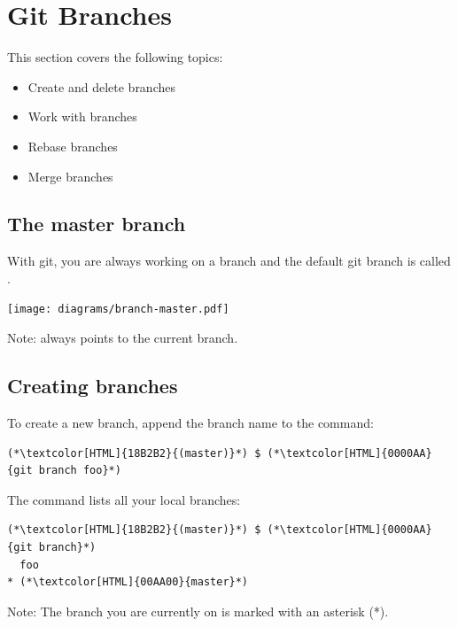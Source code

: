 \section{Git Branches}
\begin{frame}[fragile]
  \slidetitle

  This section covers the following topics:
  \begin{itemize}
    \pause
    \item Create and delete branches
    \pause
    \item Work with branches
    \pause
    \item Rebase branches
    \pause
    \item Merge branches
  \end{itemize}
\end{frame}

\subsection{The master branch}
\begin{frame}[fragile]
  \subslidetitle

  With git, you are always working on a branch and the default git branch is called .
  \newline \vspace{1em}
  \centerline{\texttt{[image: diagrams/branch-master.pdf]}}

  \vspace{1.2em}
  Note:  always points to the current branch.

\end{frame}

\subsection{Creating branches}
\begin{frame}[fragile]
  \subslidetitle

  To create a new  branch, append the branch name to the  command:
  \begin{lstlisting}
(*\textcolor[HTML]{18B2B2}{(master)}*) $ (*\textcolor[HTML]{0000AA}{git branch foo}*)
\end{lstlisting}

  The  command lists all your local branches:
  \begin{lstlisting}
(*\textcolor[HTML]{18B2B2}{(master)}*) $ (*\textcolor[HTML]{0000AA}{git branch}*)
  foo
* (*\textcolor[HTML]{00AA00}{master}*)
\end{lstlisting}

  \vspace{1em}
  Note: The branch you are currently on is marked with an asterisk (*).
\end{frame}

